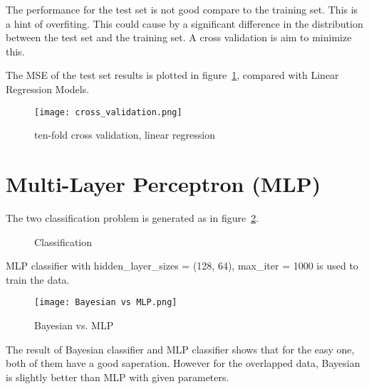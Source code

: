 \documentclass[10pt]{article}
\newcommand{\figsquish}{\vspace{-5mm}} %
\begin{document}
\begin{multicols*}{2}
The performance for the test set is not good compare to the training set. This is a hint of overfiting. 
This could cause by a significant difference in the distribution between the test set and the training set. 
A cross validation is aim to minimize this. 


The MSE of the test set results is plotted in figure~\ref*{fig:cross_validation}, compared with Linear Regression Models.

\figsquish
\begin{figure}[H]
    \centering
    \texttt{[image: cross\_validation.png]}
    \caption{ten-fold cross validation, linear regression}
    \label{fig:cross_validation}
\end{figure}

\section{Multi-Layer Perceptron (MLP)}

The two classification problem is generated as in figure~\ref*{fig:Classification}. 

\figsquish
\begin{figure}[H]
	\centering
	\caption{Classification}
	\label{fig:Classification}
\end{figure}

MLP classifier with hidden\_layer\_sizes = (128, 64), max\_iter = 1000 is used to train the data. 

\figsquish
\begin{figure}[H]
    \centering
    \texttt{[image: Bayesian vs MLP.png]}
    \caption{Bayesian vs. MLP}
    \label{fig:Bayesian vs MLP}
\end{figure}

The result of Bayesian classifier and MLP classifier shows that for the easy one, both of them have a good saperation. 
However for the overlapped data, Bayesian is slightly better than MLP with given parameters. 


\end{multicols*}
\end{document}
